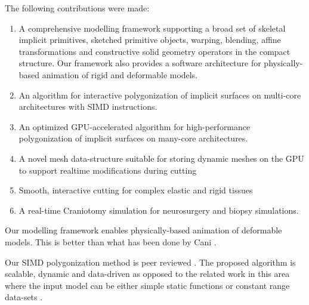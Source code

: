\label{chapter:conclusion}
The following contributions were made:


\begin{enumerate}
  
\item A comprehensive modelling framework supporting a broad set of skeletal implicit primitives, 
 sketched primitive objects, warping, blending, affine transformations and constructive solid geometry 
 operators in the compact \blob structure. Our framework also provides a software architecture for 
 physically-based animation of rigid and deformable models.
 
 \item An algorithm for interactive polygonization of implicit surfaces on multi-core architectures with 
 SIMD instructions. 
 
 \item An optimized GPU-accelerated algorithm for high-performance polygonization of implicit surfaces 
 on many-core architectures. 
 
 \item A novel mesh data-structure suitable for storing dynamic meshes on the GPU to support realtime 
 modifications during cutting
 
 \item Smooth, interactive cutting for complex elastic and rigid tissues 
 
 
\item A real-time Craniotomy simulation for neurosurgery and biopsy simulations.

\end{enumerate} 

Our modelling framework enables physically-based animation of deformable models. 
This is better than what has been done by Cani \etal \cite{Grascuel1997}.  

Our SIMD polygonization method is peer reviewed \cite{Shirazian2012}. 
The proposed algorithm is scalable, dynamic and data-driven as opposed to the related work in this 
area where the input model can be either simple static functions or constant range data-sets 
\cite{Johansson2006, Tatarchuk2007, Knoll2007, Yang2010}.

